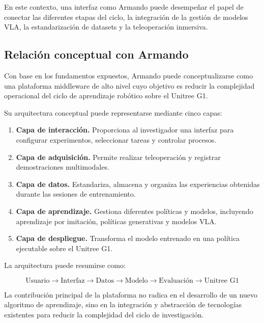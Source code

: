 \documentclass[stu,12pt,floatsintext]{apa7}
\begin{document}
En este contexto, una interfaz como Armando puede desempeñar el papel de conectar las diferentes etapas del ciclo, la integración de la gestión de modelos VLA, la estandarización de datasets y la teleoperación inmersiva.

\subsection{Relación conceptual con Armando}

Con base en los fundamentos expuestos, Armando puede conceptualizarse como una plataforma middleware de alto nivel cuyo objetivo es reducir la complejidad operacional del ciclo de aprendizaje robótico sobre el Unitree G1.

Su arquitectura conceptual puede representarse mediante cinco capas:

\begin{enumerate}
    \item \textbf{Capa de interacción.} Proporciona al investigador una interfaz para configurar experimentos, seleccionar tareas y controlar procesos.
    
    \item \textbf{Capa de adquisición.} Permite realizar teleoperación y registrar demostraciones multimodales.
    
    \item \textbf{Capa de datos.} Estandariza, almacena y organiza las experiencias obtenidas durante las sesiones de entrenamiento.
    
    \item \textbf{Capa de aprendizaje.} Gestiona diferentes políticas y modelos, incluyendo aprendizaje por imitación, políticas generativas y modelos VLA.
    
    \item \textbf{Capa de despliegue.} Transforma el modelo entrenado en una política ejecutable sobre el Unitree G1.
\end{enumerate}

La arquitectura puede resumirse como:

\begin{equation}
\boxed{
\text{Usuario}
\rightarrow
\text{Interfaz}
\rightarrow
\text{Datos}
\rightarrow
\text{Modelo}
\rightarrow
\text{Evaluación}
\rightarrow
\text{Unitree G1}
}
\end{equation}

La contribución principal de la plataforma no radica en el desarrollo de un nuevo algoritmo de aprendizaje, sino en la integración y abstracción de tecnologías existentes para reducir la complejidad del ciclo de investigación.
\end{document}
